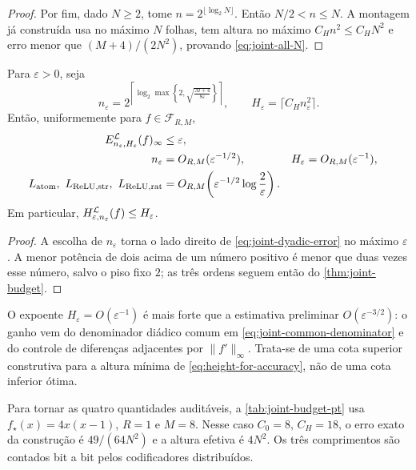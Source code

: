 \begin{proof}
Por fim, dado $N\ge2$, tome $n=2^{\lfloor\log_2N\rfloor}$. Então
$N/2<n\le N$. A montagem já construída usa no máximo $N$ folhas, tem altura
no máximo $C_Hn^2\le C_HN^2$ e erro menor que
$(M+4)/(2N^2)$, provando \eqref{eq:joint-all-N}.
\end{proof}

\begin{corollary}
\label{cor:height-for-epsilon}
Para $\varepsilon>0$, seja
\begin{equation}
 n_\varepsilon
 =2^{\left\lceil\log_2\max\left\{2,
        \sqrt{\frac{M+4}{8\varepsilon}}\right\}\right\rceil},
 \qquad
 H_\varepsilon=\lceil C_Hn_\varepsilon^2\rceil.
 \label{eq:epsilon-schedule}
\end{equation}
Então, uniformemente para $f\in\mathcal F_{R,M}$,
\begin{align}
 E_{n_\varepsilon,H_\varepsilon}^{\mathcal{L}}(f)_\infty
 &\le\varepsilon,\label{eq:epsilon-joint-error}\\
 n_\varepsilon&=O_{R,M}(\varepsilon^{-1/2}),
 &H_\varepsilon&=O_{R,M}(\varepsilon^{-1}),
 \label{eq:epsilon-joint-height}\\
 L_{\rm atom},\ L_{\rm ReLU,str},\ L_{\rm ReLU,rat}
 &=O_{R,M}\!\left(\varepsilon^{-1/2}
                   \log\frac{2}{\varepsilon}\right).
 \label{eq:epsilon-joint-bits}
\end{align}
Em particular,
$H_{\varepsilon,n_\varepsilon}^{\mathcal{L}}(f)\le H_\varepsilon$.
\end{corollary}

\begin{proof}
A escolha de $n_\varepsilon$ torna o lado direito de
\eqref{eq:joint-dyadic-error} no máximo $\varepsilon$. A menor potência de
dois acima de um número positivo é menor que duas vezes esse número, salvo o
piso fixo $2$; as três ordens seguem então do \cref{thm:joint-budget}.
\end{proof}

O expoente $H_\varepsilon=O(\varepsilon^{-1})$ é mais forte que a estimativa
preliminar $O(\varepsilon^{-3/2})$: o ganho vem do denominador diádico comum
em \eqref{eq:joint-common-denominator} e do controle de diferenças adjacentes
por $\|f'\|_\infty$. Trata-se de uma cota superior construtiva para a altura
mínima de \eqref{eq:height-for-accuracy}, não de uma cota inferior ótima.

Para tornar as quatro quantidades auditáveis, a
\cref{tab:joint-budget-pt} usa $f_\star(x)=4x(x-1)$, $R=1$ e $M=8$. Nesse
caso $C_0=8$, $C_H=18$, o erro exato da construção é
$49/(64N^2)$ e a altura efetiva é $4N^2$. Os três comprimentos são contados
bit a bit pelos codificadores distribuídos.


